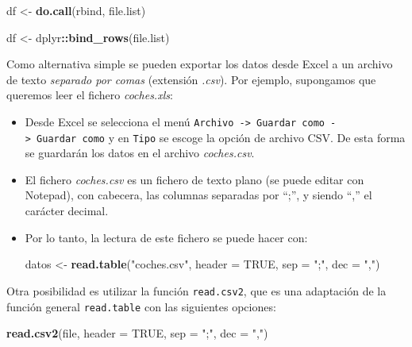 \documentclass[
]{book}
\newenvironment{Shaded}{\begin{snugshade}}{\end{snugshade}}
\newcommand{\AttributeTok}[1]{\textcolor[rgb]{0.13,0.29,0.53}{#1}}
\newcommand{\ConstantTok}[1]{\textcolor[rgb]{0.56,0.35,0.01}{#1}}
\newcommand{\FunctionTok}[1]{\textcolor[rgb]{0.13,0.29,0.53}{\textbf{#1}}}
\newcommand{\NormalTok}[1]{#1}
\newcommand{\OtherTok}[1]{\textcolor[rgb]{0.56,0.35,0.01}{#1}}
\newcommand{\SpecialCharTok}[1]{\textcolor[rgb]{0.81,0.36,0.00}{\textbf{#1}}}
\newcommand{\StringTok}[1]{\textcolor[rgb]{0.31,0.60,0.02}{#1}}
\begin{document}
\begin{Shaded}
\begin{Highlighting}[]
\NormalTok{df }\OtherTok{\textless{}{-}} \FunctionTok{do.call}\NormalTok{(}\StringTok{\textquotesingle{}rbind\textquotesingle{}}\NormalTok{, file.list)}

\NormalTok{df }\OtherTok{\textless{}{-}}\NormalTok{ dplyr}\SpecialCharTok{::}\FunctionTok{bind\_rows}\NormalTok{(file.list)}
\end{Highlighting}
\end{Shaded}

Como alternativa simple se pueden exportar los datos desde Excel a un archivo de texto \emph{separado por comas} (extensión \emph{.csv}).
Por ejemplo, supongamos que queremos leer el fichero \emph{coches.xls}:

\begin{itemize}
\item
  Desde Excel se selecciona el menú
  \texttt{Archivo\ -\textgreater{}\ Guardar\ como\ -\textgreater{}\ Guardar\ como} y en \texttt{Tipo} se escoge la opción de
  archivo CSV. De esta forma se guardarán los datos en el archivo
  \emph{coches.csv}.
\item
  El fichero \emph{coches.csv} es un fichero de texto plano (se puede
  editar con Notepad), con cabecera, las columnas separadas por ``;'', y
  siendo ``,'' el carácter decimal.
\item
  Por lo tanto, la lectura de este fichero se puede hacer con:

\begin{Shaded}
\begin{Highlighting}[]
\NormalTok{datos }\OtherTok{\textless{}{-}} \FunctionTok{read.table}\NormalTok{(}\StringTok{"coches.csv"}\NormalTok{, }\AttributeTok{header =} \ConstantTok{TRUE}\NormalTok{, }\AttributeTok{sep =} \StringTok{";"}\NormalTok{, }\AttributeTok{dec =} \StringTok{","}\NormalTok{)}
\end{Highlighting}
\end{Shaded}
\end{itemize}

Otra posibilidad es utilizar la función \texttt{read.csv2}, que es
una adaptación de la función general \texttt{read.table} con las siguientes
opciones:

\begin{Shaded}
\begin{Highlighting}[]
\FunctionTok{read.csv2}\NormalTok{(file, }\AttributeTok{header =} \ConstantTok{TRUE}\NormalTok{, }\AttributeTok{sep =} \StringTok{";"}\NormalTok{, }\AttributeTok{dec =} \StringTok{","}\NormalTok{)}
\end{Highlighting}
\end{Shaded}
\end{document}
